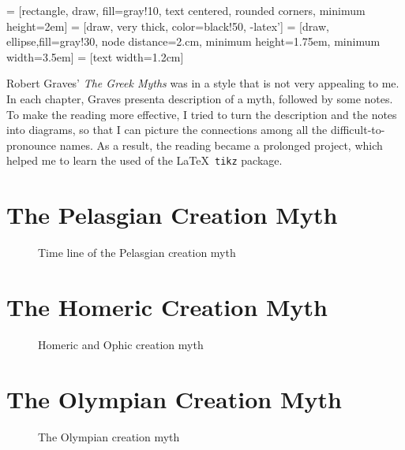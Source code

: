 \documentclass{article}
\begin{document}
\raggedright

 = [rectangle, draw, fill=gray!10,
 text centered, rounded corners, minimum height=2em]
 = [draw, very thick, color=black!50, -latex']
 = [draw, ellipse,fill=gray!30, node distance=2.cm,
    minimum height=1.75em, minimum width=3.5em]
 = [text width=1.2cm]

Robert Graves' \textit{The Greek Myths} was in a style that is not
very appealing to me. In each chapter, Graves presenta description of
a myth, followed by some notes.  To make the reading more effective, I
tried to turn the description and the notes into diagrams, so that I
can picture the connections among all the difficult-to-pronounce
names. As a result, the reading became a prolonged project, which
helped me to learn the used of the \LaTeX\ \texttt{tikz} package.

\section{The Pelasgian Creation Myth} 

\begin{figure}[htb]
\begin{center}
  \resizebox{0.95\textwidth}{!}{

} \end{center}
\caption{Time line of the Pelasgian creation myth}
\label{fig:dagsEX2}
\end{figure}

\clearpage
\section{The Homeric Creation Myth}

\begin{figure}[htb]
\begin{center}
\resizebox{0.95\textwidth}{!}{

}
\end{center}
\caption{Homeric and Ophic creation myth}
\label{fig:dagsEX}
\end{figure}

\clearpage
\section{The Olympian Creation Myth}

\begin{figure}[htb]
\begin{center}
\resizebox{0.95\textwidth}{!}{

}
\end{center}
\caption{The Olympian creation myth}
\label{fig:dagsEX}
\end{figure}
\end{document}
